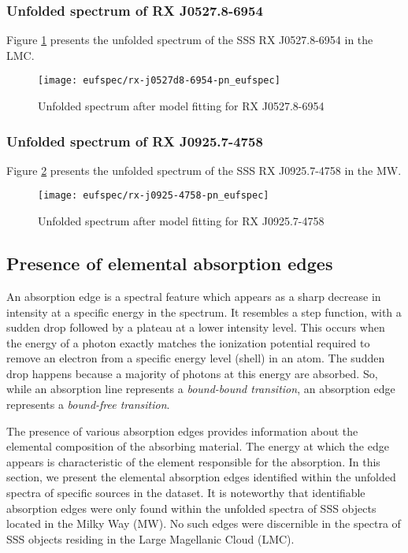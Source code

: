 			\newpage
			\subsubsection*{Unfolded spectrum of RX J0527.8-6954}
				Figure \ref{result:euf-rx-j0527} presents the unfolded spectrum of the SSS RX J0527.8-6954 in the LMC.
				\begin{figure}[h!]
					\centering
					\texttt{[image: eufspec/rx-j0527d8-6954-pn\_eufspec]}
					\caption{Unfolded spectrum after model fitting for RX J0527.8-6954}
					\label{result:euf-rx-j0527}
				\end{figure}
			
			\subsubsection*{Unfolded spectrum of RX J0925.7-4758}
				Figure \ref{result:euf-rx-j0925} presents the unfolded spectrum of the SSS RX J0925.7-4758 in the MW.
				\begin{figure}[h!]
					\centering
					\texttt{[image: eufspec/rx-j0925-4758-pn\_eufspec]}
					\caption{Unfolded spectrum after model fitting for RX J0925.7-4758}
					\label{result:euf-rx-j0925}
				\end{figure}
			
		
		\subsection{Presence of elemental absorption edges}
			An absorption edge is a spectral feature which appears as a sharp decrease in intensity at a specific energy in the spectrum. It resembles a step function, with a sudden drop followed by a plateau at a lower intensity level. This occurs when the energy of a photon exactly matches the ionization potential required to remove an electron from a specific energy level (shell) in an atom. The sudden drop happens because a majority of photons at this energy are absorbed. So, while an absorption line represents a \textit{bound-bound transition}, an absorption edge represents a \textit{bound-free transition}.
			
			The presence of various absorption edges provides information about the elemental composition of the absorbing material. The energy at which the edge appears is characteristic of the element responsible for the absorption. In this section, we present the elemental absorption edges identified within the unfolded spectra of specific sources in the dataset. It is noteworthy that identifiable absorption edges were only found within the unfolded spectra of SSS objects located in the Milky Way (MW). No such edges were discernible in the spectra of SSS objects residing in the Large Magellanic Cloud (LMC).
		
